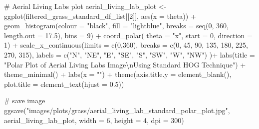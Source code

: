 \documentclass[
  letterpaper,
  DIV=11,
  numbers=noendperiod]{scrreprt}
\newenvironment{Shaded}{\begin{snugshade}}{\end{snugshade}}
\newcommand{\AttributeTok}[1]{\textcolor[rgb]{0.40,0.45,0.13}{#1}}
\newcommand{\CommentTok}[1]{\textcolor[rgb]{0.37,0.37,0.37}{#1}}
\newcommand{\DecValTok}[1]{\textcolor[rgb]{0.68,0.00,0.00}{#1}}
\newcommand{\FloatTok}[1]{\textcolor[rgb]{0.68,0.00,0.00}{#1}}
\newcommand{\FunctionTok}[1]{\textcolor[rgb]{0.28,0.35,0.67}{#1}}
\newcommand{\NormalTok}[1]{\textcolor[rgb]{0.00,0.23,0.31}{#1}}
\newcommand{\OtherTok}[1]{\textcolor[rgb]{0.00,0.23,0.31}{#1}}
\newcommand{\SpecialCharTok}[1]{\textcolor[rgb]{0.37,0.37,0.37}{#1}}
\newcommand{\StringTok}[1]{\textcolor[rgb]{0.13,0.47,0.30}{#1}}
\begin{document}
\begin{Shaded}
\begin{Highlighting}[]
\CommentTok{\# Aerial Living Labs plot}
\NormalTok{aerial\_living\_lab\_plot }\OtherTok{\textless{}{-}}
  \FunctionTok{ggplot}\NormalTok{(filtered\_grass\_standard\_df\_list[[}\DecValTok{2}\NormalTok{]], }
         \FunctionTok{aes}\NormalTok{(}\AttributeTok{x =}\NormalTok{ theta)) }\SpecialCharTok{+}
  \FunctionTok{geom\_histogram}\NormalTok{(}\AttributeTok{colour =} \StringTok{"black"}\NormalTok{, }
                 \AttributeTok{fill =} \StringTok{"lightblue"}\NormalTok{, }
                 \AttributeTok{breaks =} \FunctionTok{seq}\NormalTok{(}\DecValTok{0}\NormalTok{, }\DecValTok{360}\NormalTok{, }\AttributeTok{length.out =} \FloatTok{17.5}\NormalTok{),}
                 \AttributeTok{bins =} \DecValTok{9}\NormalTok{) }\SpecialCharTok{+}
  \FunctionTok{coord\_polar}\NormalTok{(}
    \AttributeTok{theta =} \StringTok{"x"}\NormalTok{, }
    \AttributeTok{start =} \DecValTok{0}\NormalTok{, }
    \AttributeTok{direction =} \DecValTok{1}\NormalTok{) }\SpecialCharTok{+}
  \FunctionTok{scale\_x\_continuous}\NormalTok{(}\AttributeTok{limits =} \FunctionTok{c}\NormalTok{(}\DecValTok{0}\NormalTok{,}\DecValTok{360}\NormalTok{),}
    \AttributeTok{breaks =} \FunctionTok{c}\NormalTok{(}\DecValTok{0}\NormalTok{, }\DecValTok{45}\NormalTok{, }\DecValTok{90}\NormalTok{, }\DecValTok{135}\NormalTok{, }\DecValTok{180}\NormalTok{, }\DecValTok{225}\NormalTok{, }\DecValTok{270}\NormalTok{, }\DecValTok{315}\NormalTok{), }
    \AttributeTok{labels =} \FunctionTok{c}\NormalTok{(}\StringTok{"N"}\NormalTok{, }\StringTok{"NE"}\NormalTok{, }\StringTok{"E"}\NormalTok{, }\StringTok{"SE"}\NormalTok{, }\StringTok{"S"}\NormalTok{, }\StringTok{"SW"}\NormalTok{, }\StringTok{"W"}\NormalTok{, }\StringTok{"NW"}\NormalTok{)}
\NormalTok{  )}\SpecialCharTok{+}
  \FunctionTok{labs}\NormalTok{(}\AttributeTok{title =} \StringTok{"Polar Plot of Aerial Living Labs Image}\SpecialCharTok{\textbackslash{}n}\StringTok{Using Standard HOG Technique"}\NormalTok{) }\SpecialCharTok{+}
  \FunctionTok{theme\_minimal}\NormalTok{() }\SpecialCharTok{+}
  \FunctionTok{labs}\NormalTok{(}\AttributeTok{x =} \StringTok{""}\NormalTok{) }\SpecialCharTok{+}
  \FunctionTok{theme}\NormalTok{(}\AttributeTok{axis.title.y =} \FunctionTok{element\_blank}\NormalTok{(),}
        \AttributeTok{plot.title =} \FunctionTok{element\_text}\NormalTok{(}\AttributeTok{hjust =} \FloatTok{0.5}\NormalTok{))}

\CommentTok{\# save image}
\FunctionTok{ggsave}\NormalTok{(}\StringTok{"images/plots/grass/aerial\_living\_lab\_standard\_polar\_plot.jpg"}\NormalTok{, aerial\_living\_lab\_plot, }\AttributeTok{width =} \DecValTok{6}\NormalTok{, }\AttributeTok{height =} \DecValTok{4}\NormalTok{, }\AttributeTok{dpi =} \DecValTok{300}\NormalTok{)}
\end{Highlighting}
\end{Shaded}
\end{document}
